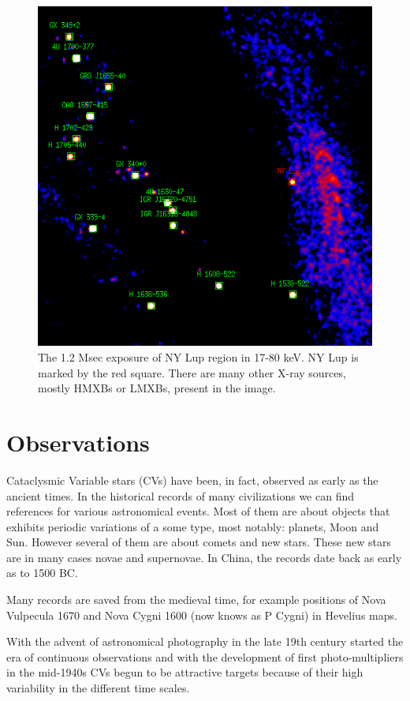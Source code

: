 \documentclass[oneside,a4paper,11pt]{report}
\begin{document}
\begin{figure}[!hbt]
\centering
\includegraphics[totalheight=12cm]{plot/ds9_3}
\caption{The 1.2 Msec exposure of NY Lup region in 17-80 keV. NY Lup is marked by the red square. There are many other X-ray sources,
mostly HMXBs or LMXBs, present in the image.}
\label{nylup1} 
\end{figure}



\section{Observations}
Cataclysmic Variable stars (CVs) have been, in fact, observed as early as the ancient times. In the historical 
records of  many civilizations we can find references for various astronomical events. Most of them are about objects
that exhibits periodic variations of a some type, most notably: planets, Moon and Sun. However several of them are about comets and new stars.  
These new stars are in many cases novae and supernovae. In China, the records date back as early as to 1500 BC. 

Many records are saved from the medieval time, for example positions of Nova Vulpecula 1670 and 
Nova Cygni 1600 (now knows as P Cygni) in Hevelius maps. 

With the advent of astronomical photography in the late 19th century started the era of continuous observations
and with the development of first photo-multipliers in the mid-1940s CVs begun to be attractive 
targets because of their high variability in the different time scales. 
\end{document}
